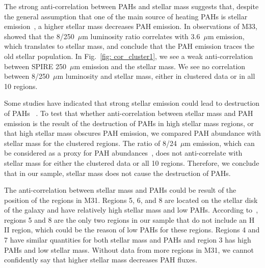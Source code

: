         The strong anti-correlation between PAHs and stellar mass suggests that, despite the general assumption that one of the main source of heating PAHs is stellar emission~\citep[e.g][]{Haas02,Bendo08,Calapa14, Lu14,Jones15}, a higher stellar mass decreases PAH emission.
        In observations of M33,~\cite{Calapa14} showed that the 8/250~$\mu$m luminosity ratio correlates with 3.6~$\mu$m emission, which translates to stellar mass, and conclude that the PAH emission traces the old stellar population.
        In Fig.~\ref{fig: cor_cluster1}, we see a weak anti-correlation between SPIRE 250~$\mu$m emission and the stellar mass.
        We see no correlation between 8/250~$\mu$m luminosity and stellar mass, either in clustered data or in all 10 regions.
        
        Some studies have indicated that strong stellar emission could lead to destruction of PAHs ~\citep[e.g.][]{Clayton03,Seok14}.
        To test that whether anti-correlation between stellar mass and PAH emission is the result of the destruction of PAHs in high stellar mass regions, or that high stellar mass obscures PAH emission, we compared PAH abundance with stellar mass for the clustered regions.
        The ratio of 8/24~$\mu$m emission, which can be considered as a proxy for PAH abundances~\citep[e.g.][]{Sandstrom10,Khramtsova13}, does not anti-correlate with stellar mass for either the clustered data or all 10 regions.
        Therefore, we conclude that in our sample,  stellar mass does not cause the destruction of PAHs.
        
        The anti-correlation between stellar mass and PAHs could be result of the position of the regions in M31.
        Regions 5, 6, and 8 are located on the stellar disk of the galaxy and have relatively high stellar mass and low PAHs. 
        According to~\cite{Dim15}, regions 5 and 8 are the only two regions in our sample that do not include an H {\sc II} region, which could be the reason of low PAHs for these regions.
        Regions 4 and 7 have similar quantities for both stellar mass and PAHs and region 3 has high PAHs and low stellar mass.
        Without data from more regions in M31, we cannot confidently say that higher stellar mass decreases PAH fluxes.
        
